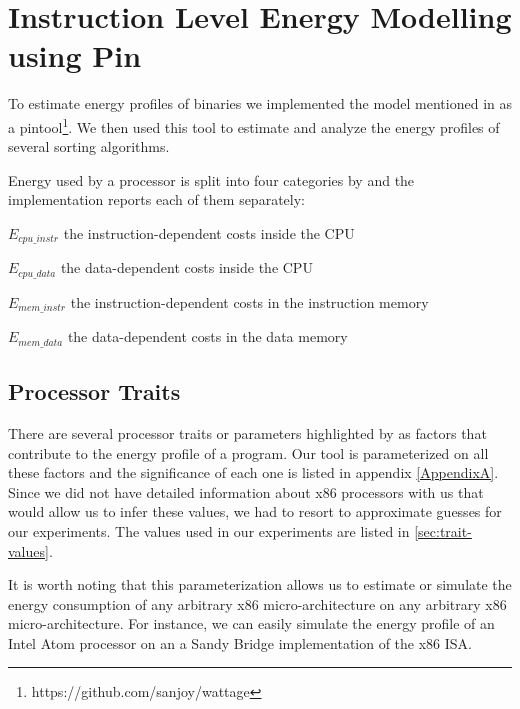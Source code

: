 
\chapter{Instruction Level Energy Modelling using Pin}

\label{Chapter2}


To estimate energy profiles of binaries we implemented the model
mentioned in \cite[Steinke et. al.]{steinke} as a
pintool\footnote{https://github.com/sanjoy/wattage}.  We then used
this tool to estimate and analyze the energy profiles of several
sorting algorithms.

Energy used by a processor is split into four categories by
\cite{steinke} and the implementation reports each of them separately:

\begin{description*}
\item[$E_{cpu\_instr}$] the instruction-dependent costs inside the CPU
\item[$E_{cpu\_data}$] the data-dependent costs inside the CPU
\item[$E_{mem\_instr}$] the instruction-dependent costs in the
  instruction memory
\item[$E_{mem\_data}$] the data-dependent costs in the data memory
\end{description*}

\section{Processor Traits}

There are several processor traits or parameters highlighted by
\cite{steinke} as factors that contribute to the energy profile of a
program.  Our tool is parameterized on all these factors and the
significance of each one is listed in appendix \ref{AppendixA}.  Since
we did not have detailed information about x86 processors with us that
would allow us to infer these values, we had to resort to approximate
guesses for our experiments.  The values used in our experiments are
listed in \ref{sec:trait-values}.

It is worth noting that this parameterization allows us to estimate or
simulate the energy consumption of any arbitrary x86
micro-architecture on any arbitrary x86 micro-architecture.  For
instance, we can easily simulate the energy profile of an Intel Atom
processor on an a Sandy Bridge implementation of the x86 ISA.


